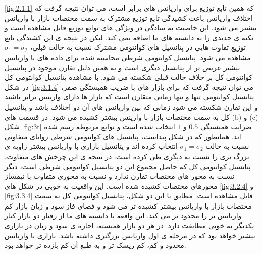 \documentclass[a4paper,titlepage,12pt,fleqn,oneside]{report}
\begin{document}
	\ref{fig:2.1.1}
	که همین تابع توزیع برای واریانس های برابر است، می توان نتیجه گرفت که اختلاف واریانس باعث کشیدگی تابع توزیع مشترک به سمت مختصات بازار با واریانس بیشتر می شود. این خاصیت به سادگی در ویژگی های توابع توزیع قابل مشاهده است و نکته ی جدیدی را به دانسته های ما اضافه نمی کند. لیکن در نتیجه ی این کشیدگی تابع توزیع تفاوت هایی در پتانسیل های کوانتومی مشترک نسبت به حالت قبلی،
	$\sigma_1 =\sigma_2$
	مشاهده می شود. پتانسیل کوانتومی شرطی محاسبه شده برای داده های با واریانس بیشتر عریض تر از پتانسیل دیگری است و به همین دلیل تقارن موجود در پتانسیل کوانتومی کل بر خلاف حالت قبلی شکسته می شود. با مشاهده پتانسیل کوانتومی کل در شکل
	\ref{fig:3.1.4}
	می توان نتیجه گرفت که برای بازار های با ضریب همبستگی صفر، پتانسیل کوانتومی تنها و تنها زمانی متقارن است که بازار ها دارای وارینس برابر باشند و این تقارن شکسته می شود زمانی که بین واریانس های آن دو اختلاف باشد و پتانسیل کل به سمت مختصات بازار با وارینس بیشتر کشیده می شود.
	در قسمت های (b) و (c)  شکل
	\ref*{fig:3t}
	ضرایب همبستگی 
	$0.5$
	و
	$1$
	انتخاب شده است و توابع مربوطه رسم شده اند. همانطور که در شکل پیداست، پتانسیل های کوانتومی شرطی زوایای متفاوتی نسبت به حالت 
	$\sigma_1 =\sigma_2$
	انتخاب کرده اند و پتانسیل بازاری با واریانس بیشتر زاویه ی بزرگ تری را نسبت به دیگری طی کرده است. در نتیجه ی این چرخش های متفاوت، پتانسیل کوانتومی کل که حاصل مجموع این دو پتانسیل کوانتومی شرطی است، دیگر نسبت به محور های مختصات تقارن ندارد و نسبت به محوری متفاوت با نیمساز محورهای مختصات کشیده شده است. این واقعیت به خوبی در شکل های 
	\ref{fig:3.2.4}
	و 
	\ref{fig:3.3.4}
	قابل مشاهده است. مطابق با این دو شکل، پتانسیل کوانتومی کل به سمت مختصات بازار با واریانس بیشتر کشیده تر می شود و فضای فاز سود و زیان بازار کم واریانس تر را محدود تر می کند. این واقعه با دانسته های ما از رفتار دو بازار کنار یکدیگر به خوبی مطابقت دارد. در هر دو بازار همبسته، اجازه ی سود و زیان در بازاری بیشتر خواهد بود که در مرحله ی اول واریانس بزرگتری داشته باشد. بازاری با واریانس محدود و کم، کم ریسک تر و به طبع آن کم بازده تر خواهد بود. 
	
\end{document}
